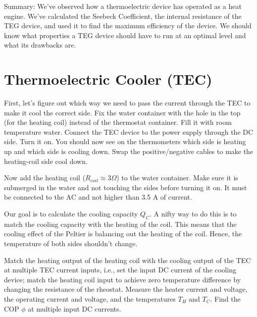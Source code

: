 \documentclass[
  letterpaper,
  DIV=11,
  numbers=noendperiod]{scrreprt}
\begin{document}
Summary: We've observed how a thermoelectric device has operated as a
heat engine. We've calculated the Seebeck Coefficient, the internal
resistance of the TEG device, and used it to find the maximum efficiency
of the device. We should know what properties a TEG device should have
to run at an optimal level and what its drawbacks are.

\hypertarget{thermoelectric-cooler-tec}{%
\section{Thermoelectric Cooler (TEC)}\label{thermoelectric-cooler-tec}}

First, let's figure out which way we need to pass the current through
the TEC to make it cool the correct side. Fix the water container with
the hole in the top (for the heating coil) instead of the thermostat
container. Fill it with room temperature water. Connect the TEC device
to the power supply through the DC side. Turn it on. You should now see
on the thermometers which side is heating up and which side is cooling
down. Swap the positive/negative cables to make the heating-coil side
cool down.

Now add the heating coil (\(R_{coil} \approx 3\Omega\)) to the water
container. Make sure it is submerged in the water and not touching the
sides before turning it on. It must be connected to the AC and not
higher than 3.5 A of current.

Our goal is to calculate the cooling capacity \(\dot{Q}_{C}\). A nifty
way to do this is to match the cooling capacity with the heating of the
coil. This means that the cooling effect of the Peltier is balancing out
the heating of the coil. Hence, the temperature of both sides shouldn't
change.

\begin{tcolorbox}[enhanced jigsaw, toprule=.15mm, coltitle=black, bottomrule=.15mm, colbacktitle=quarto-callout-note-color!10!white, opacitybacktitle=0.6, titlerule=0mm, colframe=quarto-callout-note-color-frame, title={Task 4}, leftrule=.75mm, bottomtitle=1mm, breakable, opacityback=0, arc=.35mm, left=2mm, colback=white, rightrule=.15mm, toptitle=1mm]

Match the heating output of the heating coil with the cooling output of
the TEC at multiple TEC current inputs, i.e., set the input DC current
of the cooling device; match the heating coil input to achieve zero
temperature difference by changing the resistance of the rheostat.
Measure the heater current and voltage, the operating current and
voltage, and the temperatures \(T_{H}\) and \(T_{C}\). Find the COP
\(\phi\) at multiple input DC currents.

\end{tcolorbox}
\end{document}
